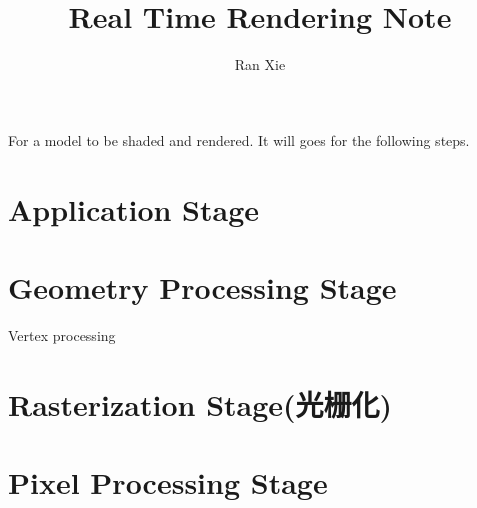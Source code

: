 \documentclass[UTF8]{ctexart}
\title{Real Time Rendering Note}
\author{Ran Xie}
\begin{document}
\maketitle
\tableofcontents

For a model to be shaded and rendered. It will goes for the following steps.

\section{Application Stage}
	
\section{Geometry Processing Stage}
Vertex processing

\section{Rasterization Stage(光栅化)}
\section{Pixel Processing Stage}
	
\end{document}
